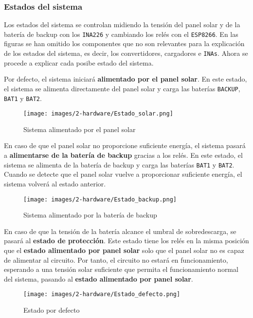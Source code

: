 \subsubsection{Estados del sistema}

Los estados del sistema se controlan midiendo la tensión del panel solar y de la batería de backup con los \texttt{INA226} y cambiando los relés con el \texttt{ESP8266}. En las figuras se han omitido los componentes que no son relevantes para la explicación de los estados del sistema, es decir, los convertidores, cargadores e \texttt{INAs}. Ahora se procede a explicar cada posibe estado del sistema.

Por defecto, el sistema iniciará \textbf{alimentado por el panel solar}. En este estado, el sistema se alimenta directamente del panel solar y carga las baterías \texttt{BACKUP}, \texttt{BAT1} y \texttt{BAT2}.

\begin{figure}[H]
    \centering
    \texttt{[image: images/2-hardware/Estado\_solar.png]}
    \caption{Sistema alimentado por el panel solar}
    \label{fig:hardware/estados/solar}
\end{figure}

En caso de que el panel solar no proporcione suficiente energía, el sistema pasará a \textbf{alimentarse de la batería de backup} gracias a los relés. En este estado, el sistema se alimenta de la batería de backup y carga las baterías \texttt{BAT1} y \texttt{BAT2}. Cuando se detecte que el panel solar vuelve a proporcionar suficiente energía, el sistema volverá al estado anterior.

\begin{figure}[H]
    \centering
    \texttt{[image: images/2-hardware/Estado\_backup.png]}
    \caption{Sistema alimentado por la batería de backup}
    \label{fig:hardware/estados/backup}
\end{figure}

En caso de que la tensión de la batería alcance el umbral de sobredescarga, se pasará al \textbf{estado de protección}. Este estado tiene los relés en la misma posición que el \textbf{estado alimentado por panel solar} solo que el panel solar no es capaz de alimentar al circuito. Por tanto, el circuito no estará en funcionamiento, esperando a una tensión solar suficiente que permita el funcionamiento normal del sistema, pasando al \textbf{estado alimentado por panel solar}.

\begin{figure}[H]
    \centering
    \texttt{[image: images/2-hardware/Estado\_defecto.png]}
    \caption{Estado por defecto}
    \label{fig:hardware/estados/defecto}
\end{figure}
